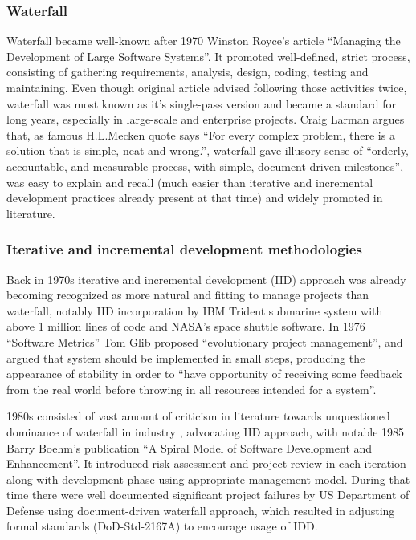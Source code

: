 \documentclass{article}
\begin{document}
\subsubsection{Waterfall}
Waterfall became well-known after 1970 Winston Royce's article ``Managing the Development of Large Software Systems''. It promoted well-defined, strict process, consisting of gathering requirements, analysis, design, coding, testing and maintaining. Even though original article advised following those activities twice, waterfall was most known as it's single-pass version and became a standard for long years, especially in large-scale and enterprise projects. Craig Larman \cite{larman2003iterative} argues that, as famous H.L.Mecken quote says ``For every complex problem, there is a solution that is simple, neat and wrong.'', waterfall gave illusory sense of ``orderly, accountable, and measurable process, with simple, document-driven milestones'', was easy to explain and recall (much easier than iterative and incremental development practices already present at that time) and widely promoted in literature.

\subsubsection{Iterative and incremental development methodologies}
Back in 1970s iterative and incremental development (IID) approach was already becoming recognized as more natural and fitting to manage projects than waterfall, notably IID incorporation by IBM Trident submarine system with above 1 million lines of code and NASA's space shuttle software. In 1976 ``Software Metrics'' Tom Glib proposed ``evolutionary project management'', and argued that system should be implemented in small steps, producing the appearance of stability in order to ``have opportunity of receiving some feedback from the real world before throwing in all resources intended for a system''.

1980s consisted of vast amount of criticism in literature towards unquestioned dominance of waterfall in industry \cite{larman2003iterative}, advocating IID approach, with notable 1985 Barry Boehm's publication ``A Spiral Model of Software Development and Enhancement''. It introduced risk assessment and project review in each iteration along with development phase using appropriate management model. During that time there were well documented significant project failures by US Department of Defense using document-driven waterfall approach, which resulted in adjusting formal standards (DoD-Std-2167A) to encourage usage of IDD.
\end{document}
